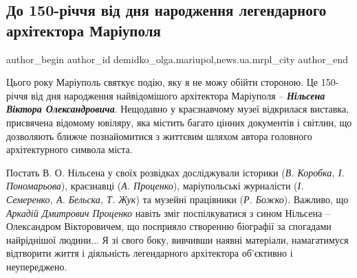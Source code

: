  
 
 
 
 
 
\subsection{До 150-річчя від дня народження легендарного архітектора Маріуполя}
\label{sec:22_02_2021.stz.news.ua.mrpl_city.1.nilsen_150_rokiv}
 
\ifcmt
 author_begin
   author_id demidko_olga.mariupol,news.ua.mrpl_city
 author_end
\fi


Цього року Маріуполь святкує подію, яку я не можу обійти стороною. Це 150-річчя
від дня народження найвідомішого архітектора Маріуполя – \emph{\textbf{Нільсена Віктора
Олександровича}}. Нещодавно у краєзнавчому музеї відкрилася виставка, присвячена
відомому ювіляру, яка містить багато цінних документів і світлин, що дозволяють
ближче познайомитися з життєвим шляхом автора головного архітектурного символа
міста.

Постать В. О. Нільсена у своїх розвідках досліджували історики (\emph{В. Коробка, І.
Пономарьова}), краєзнавці (\emph{А. Проценко}), маріупольські журналісти (\emph{І. Семеренко,
А. Бельска, Т. Жук}) та музейні працівники (\emph{Р. Божко}). Важливо, що \emph{Аркадій
Дмитрович Проценко} навіть зміг поспілкуватися з сином Нільсена – Олександром
Вікторовичем, що посприяло створенню біографії за спогадами найріднішої людини...
Я зі свого боку, вивчивши наявні матеріали, намагатимуся відтворити життя і
діяльність легендарного архітектора об'єктивно і неупереджено.


